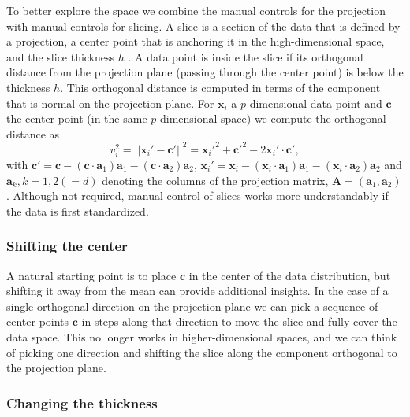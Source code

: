 \documentclass[]{interact}
\theoremstyle{plain}%
\theoremstyle{definition}
\theoremstyle{remark}
\begin{document}
To better explore the space we combine the manual controls for the
projection with manual controls for slicing. A slice is a section of the
data that is defined by a projection, a center point that is anchoring
it in the high-dimensional space, and the slice thickness \(h\)
\citep{slicetour}. A data point is inside the slice if its orthogonal
distance from the projection plane (passing through the center point) is
below the thickness \(h\). This orthogonal distance is computed in terms
of the component that is normal on the projection plane. For
\(\mathbf{x}_i\) a \(p\) dimensional data point and \(\mathbf{c}\) the
center point (in the same \(p\) dimensional space) we compute the
orthogonal distance as \begin{equation}
v_i^2 = ||\mathbf{x}_i' - \mathbf{c}'||^2 = \mathbf{x}_i'^2 + \mathbf{c}'^2 - 2 \mathbf{x}_i'\cdot\mathbf{c}' ,
\label{eq:slice}
\end{equation} with
\(\mathbf{c}' = \mathbf{c} - (\mathbf{c}\cdot \mathbf{a}_1) \mathbf{a}_1 - (\mathbf{c}\cdot \mathbf{a}_2 )\mathbf{a}_2\),
\(\mathbf{x}_i' = \mathbf{x}_i - (\mathbf{x}_i\cdot \mathbf{a}_1) \mathbf{a}_1 - (\mathbf{x}_i\cdot \mathbf{a}_2) \mathbf{a}_2\)
and \(\mathbf{a}_k, k=1,2 (=d)\) denoting the columns of the projection
matrix, \(\mathbf{A}=(\mathbf{a}_1, \mathbf{a}_2)\). Although not
required, manual control of slices works more understandably if the data
is first standardized.

\hypertarget{shifting-the-center}{%
\subsubsection{Shifting the center}\label{shifting-the-center}}

A natural starting point is to place \(\mathbf{c}\) in the center of the
data distribution, but shifting it away from the mean can provide
additional insights. In the case of a single orthogonal direction on the
projection plane we can pick a sequence of center points \(\mathbf{c}\)
in steps along that direction to move the slice and fully cover the data
space. This no longer works in higher-dimensional spaces, and we can
think of picking one direction and shifting the slice along the
component orthogonal to the projection plane.

\hypertarget{changing-the-thickness}{%
\subsubsection{Changing the thickness}\label{changing-the-thickness}}
\end{document}
